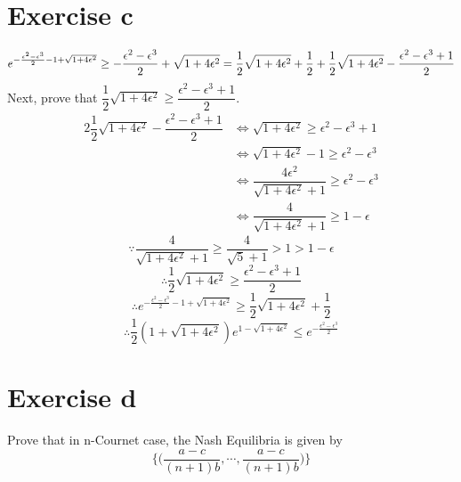 \documentclass[a4papers]{ctexart}
\begin{document}
\section*{Exercise c}
\[
    e^{-\frac{\epsilon^2-\epsilon^3}{2}-1+\sqrt{1+4\epsilon^2} } \ge -\frac{\epsilon^2-\epsilon^3}{2}+\sqrt{1+4\epsilon^2}\\
    = \dfrac{1}{2}\sqrt{1+4\epsilon^2} + \dfrac{1}{2} + \dfrac{1}{2}\sqrt{1+4\epsilon^2} - \dfrac{\epsilon^2-\epsilon^3+1}{2}
\]
Next, prove that $\dfrac{1}{2}\sqrt{1+4\epsilon^2} \ge \dfrac{\epsilon^2-\epsilon^3+1}{2}$.
\begin{alignat*}{2}
    \dfrac{1}{2}\sqrt{1+4\epsilon^2} - \dfrac{\epsilon^2-\epsilon^3+1}{2} &\Leftrightarrow \sqrt{1+4\epsilon^2} \ge \epsilon^2-\epsilon^3+1 \\
    &\Leftrightarrow \sqrt{1+4\epsilon^2}-1 \ge \epsilon^2-\epsilon^3\\
    &\Leftrightarrow \dfrac{4\epsilon^2}{\sqrt{1+4\epsilon^2}+1} \ge \epsilon^2-\epsilon^3\\
    &\Leftrightarrow \dfrac{4}{\sqrt{1+4\epsilon^2}+1} \ge 1-\epsilon
\end{alignat*} 
\[\because \dfrac{4}{\sqrt{1+4\epsilon^2}+1} \ge \dfrac{4}{\sqrt{5}+1} > 1 > 1-\epsilon  \]
\[\therefore \dfrac{1}{2}\sqrt{1+4\epsilon^2} \ge \dfrac{\epsilon^2-\epsilon^3+1}{2} \]
\[\therefore e^{-\frac{\epsilon^2-\epsilon^3}{2}-1+\sqrt{1+4\epsilon^2} } \ge \dfrac{1}{2}\sqrt{1+4\epsilon^2} + \dfrac{1}{2}  \]
\[\therefore \dfrac{1}{2}(1+\sqrt{1+4\epsilon^2}) e^{1-\sqrt{1+4\epsilon^2}} \le e^{-\frac{\epsilon^2-\epsilon^3}{2}}\]

\section*{Exercise d}
\noindent Prove that in n-Cournet case, the Nash Equilibria is given by
\[ \Big\{ \Big(\dfrac{a-c}{(n+1)b},\cdots,\dfrac{a-c}{(n+1)b}  \Big) \Big\} \]
\end{document}
